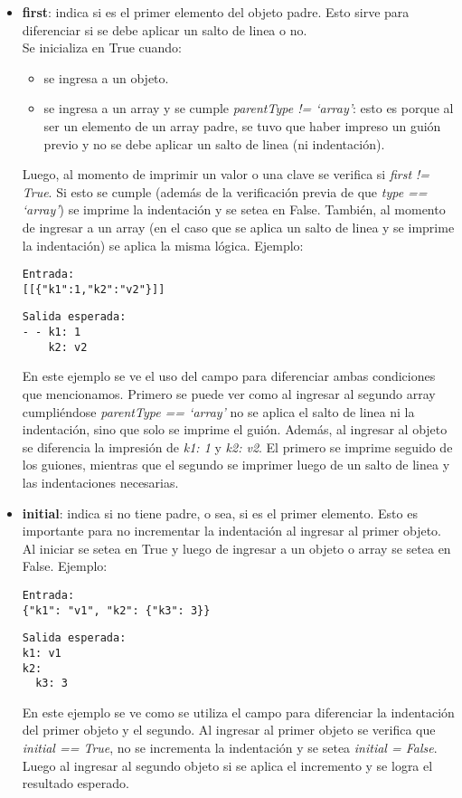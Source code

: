 \begin{itemize}
    \item \textbf{first}: indica si es el primer elemento del objeto padre. Esto sirve para diferenciar si se debe aplicar un salto de linea o no. \\
    Se inicializa en True cuando:
    \begin{itemize}
      \item se ingresa a un objeto.
      \item se ingresa a un array y se cumple \textit{parentType != `array'}: esto es porque al ser un elemento de un array padre, se tuvo que haber impreso un guión previo y no se debe aplicar un salto de linea (ni indentación).
    \end{itemize}
    Luego, al momento de imprimir un valor o una clave se verifica si \textit{first != True}. Si esto se cumple (además de la verificación previa de que \textit{type == `array'}) se imprime la indentación y se setea en False. También, al momento de ingresar a un array (en el caso que se aplica un salto de linea y se imprime la indentación) se aplica la misma lógica.
    Ejemplo:
    \begin{verbatim}
Entrada:
[[{"k1":1,"k2":"v2"}]]
    \end{verbatim}
    \begin{verbatim}
Salida esperada:
- - k1: 1
    k2: v2
    \end{verbatim}
    En este ejemplo se ve el uso del campo para diferenciar ambas condiciones que mencionamos. Primero se puede ver como al ingresar al segundo array cumpliéndose \textit{parentType == `array'} no se aplica el salto de linea ni la indentación, sino que solo se imprime el guión. Además, al ingresar al objeto se diferencia la impresión de \textit{k1: 1} y \textit{k2: v2}. El primero se imprime seguido de los guiones, mientras que el segundo se imprimer luego de un salto de linea y las indentaciones necesarias.

    \item \textbf{initial}: indica si no tiene padre, o sea, si es el primer elemento. Esto es importante para no incrementar la indentación al ingresar al primer objeto.
    Al iniciar se setea en True y luego de ingresar a un objeto o array se setea en False.
    Ejemplo:
    \begin{verbatim}
Entrada:
{"k1": "v1", "k2": {"k3": 3}}
    \end{verbatim}
    \begin{verbatim}
Salida esperada:
k1: v1
k2:
  k3: 3
    \end{verbatim}
    En este ejemplo se ve como se utiliza el campo para diferenciar la indentación del primer objeto y el segundo. Al ingresar al primer objeto se verifica que \textit{initial == True}, no se incrementa la indentación y se setea \textit{initial = False}. Luego al ingresar al segundo objeto si se aplica el incremento y se logra el resultado esperado.


\end{itemize}
